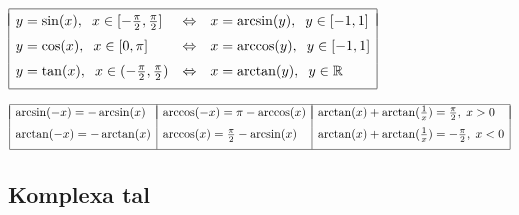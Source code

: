 \documentclass{article}
\begin{document}
$\begin{array}{|lll|}\hline && \\*[-9pt] 
  y=\sin(x),\hspace{2 mm} x\in[-\frac{\pi}{2},\frac{\pi}{2}]&
  \iff &
  x=\arcsin(y),\hspace{2 mm} y\in[-1,1] \EndRow 
  y=\cos(x),\hspace{2 mm} x\in[0,\pi]&
  \iff &
  x=\arccos(y),\hspace{2 mm} y\in[-1,1] \EndRow 
  y=\tan(x),\hspace{2 mm} x\in(-\frac{\pi}{2},\frac{\pi}{2})&
  \iff &
  x=\arctan(y), \hspace{2 mm} y\in\mathbb{R}\\*[6pt]\hline
\end{array}$  

\vspace{1 mm}

$\begin{array}{|l|l|l|}\hline & & \\*[-11pt]
\arcsin(-x)=-\arcsin(x) & \arccos(-x)=\pi-\arccos(x) & 
  \arctan(x)+\arctan(\tfrac1x)=\frac\pi2, \; x>0 \EndRow %
\arctan(-x)=-\arctan(x) &\arccos(x)=\frac{\pi}{2}-\arcsin(x) & 
  \arctan(x)+\arctan(\tfrac1x)=-\frac\pi2, \; x < 0 \\*[6pt] %
\hline
\end{array}$%

\subsection*{Komplexa tal}%
\end{document}
